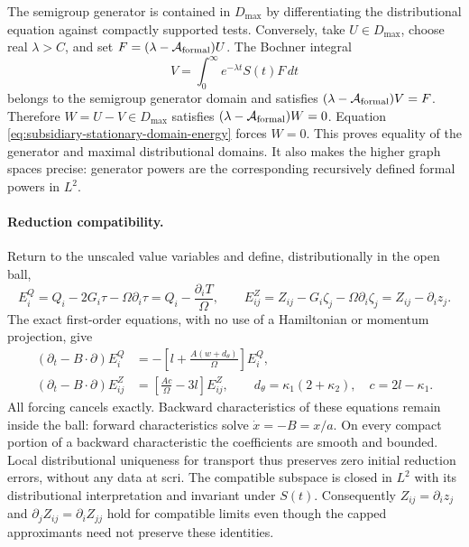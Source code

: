 The semigroup generator is contained in $D_{\max}$ by differentiating the
distributional equation against compactly supported tests. Conversely,
take $U\in D_{\max}$, choose real $\lambda>C$, and set
$F=(\lambda-\mathcal A_{\rm formal})U$. The Bochner integral
\[
 V=\int_0^\infty e^{-\lambda t}S(t)F\,dt
\]
belongs to the semigroup generator domain and satisfies
$(\lambda-\mathcal A_{\rm formal})V=F$. Therefore $W=U-V\in D_{\max}$
satisfies $(\lambda-\mathcal A_{\rm formal})W=0$.
Equation \eqref{eq:subsidiary-stationary-domain-energy} forces $W=0$.
This proves equality of the generator and maximal distributional domains.
It also makes the higher graph spaces precise: generator powers are the
corresponding recursively defined formal powers in $L^2$.

\paragraph{Reduction compatibility.}
Return to the unscaled value variables and define, distributionally in the
open ball,
\[
 E^Q_i=Q_i-2G_i\tau-\Omega\partial_i\tau
       =Q_i-\frac{\partial_iT}{\Omega},\qquad
 E^Z_{ij}=Z_{ij}-G_i\zeta_j-\Omega\partial_i\zeta_j
       =Z_{ij}-\partial_i z_j .
\]
The exact first-order equations, with no use of a Hamiltonian or momentum
projection, give
\begin{align}
 (\partial_t-B\cdot\partial)E^Q_i
  &=-\left[l+\frac{A(w+d_\theta)}\Omega\right]E^Q_i,\\
 (\partial_t-B\cdot\partial)E^Z_{ij}
  &=\left[\frac{Ac}\Omega-3l\right]E^Z_{ij},
 \qquad d_\theta=\kappa_1(2+\kappa_2),\quad c=2l-\kappa_1.
 \label{eq:subsidiary-reduction-transport}
\end{align}
All forcing cancels exactly. Backward characteristics of these equations
remain inside the ball: forward characteristics solve $\dot x=-B=x/a$.
On every compact portion of a backward characteristic the coefficients are
smooth and bounded. Local distributional uniqueness for transport thus
preserves zero initial reduction errors, without any data at scri.
The compatible subspace is closed in $L^2$ with its distributional
interpretation and invariant under $S(t)$. Consequently
$Z_{ij}=\partial_i z_j$ and
$\partial_jZ_{ij}=\partial_iZ_{jj}$ hold for compatible limits even though
the capped approximants need not preserve these identities.

